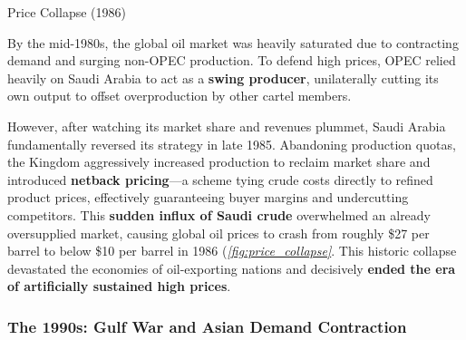 \documentclass[10pt]{article}
\begin{document}
      \begin{core}[label=core:price_collapse]{Price Collapse (1986)}

        By the mid-1980s, the global oil market was heavily saturated due to contracting demand and surging non-OPEC production. To defend high prices, OPEC relied heavily on Saudi Arabia to act as a \textbf{swing producer}, unilaterally cutting its own output to offset overproduction by other cartel members.


        However, after watching its market share and revenues plummet, Saudi Arabia fundamentally reversed its strategy in late 1985. Abandoning production quotas, the Kingdom aggressively increased production to reclaim market share and introduced \textbf{netback pricing}---a scheme tying crude costs directly to refined product prices, effectively guaranteeing buyer margins and undercutting competitors. This \textbf{sudden influx of Saudi crude} overwhelmed an already oversupplied market, causing global oil prices to crash from roughly \$27 per barrel to below \$10 per barrel in 1986 (\textit{\autoref{fig:price_collapse}}. This historic collapse devastated the economies of oil-exporting nations and decisively \textbf{ended the era of artificially sustained high prices}.

      \end{core}

    \subsubsection{The 1990s: Gulf War and Asian Demand Contraction}
\end{document}

